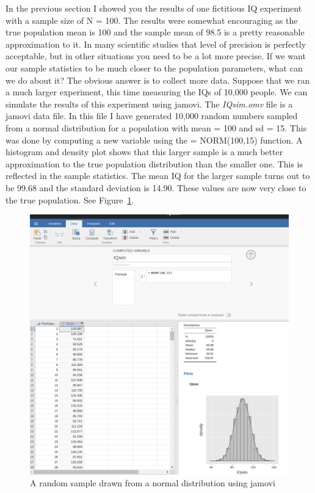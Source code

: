 \documentclass[
  a4paper,
]{book}
\begin{document}
In the previous section I showed you the results of one fictitious IQ
experiment with a sample size of N = 100. The results were somewhat
encouraging as the true population mean is 100 and the sample mean of
98.5 is a pretty reasonable approximation to it. In many scientific
studies that level of precision is perfectly acceptable, but in other
situations you need to be a lot more precise. If we want our sample
statistics to be much closer to the population parameters, what can we
do about it? The obvious answer is to collect more data. Suppose that we
ran a much larger experiment, this time measuring the IQs of 10,000
people. We can simulate the results of this experiment using jamovi. The
\emph{IQsim.omv} file is a jamovi data file. In this file I have
generated 10,000 random numbers sampled from a normal distribution for a
population with mean = 100 and sd = 15. This was done by computing a new
variable using the = NORM(100,15) function. A histogram and density plot
shows that this larger sample is a much better approximation to the true
population distribution than the smaller one. This is reflected in the
sample statistics. The mean IQ for the larger sample turns out to be
99.68 and the standard deviation is 14.90. These values are now very
close to the true population. See Figure~\ref{fig-fig8-5}.

\begin{figure}

\includegraphics[width=1\textwidth,height=\textheight]{images/fig8-5.png} \hfill{}

\caption{\label{fig-fig8-5}A random sample drawn from a normal
distribution using jamovi}

\end{figure}
\end{document}

